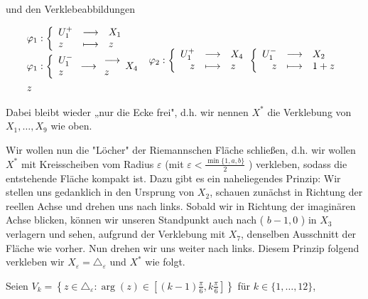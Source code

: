 \documentclass[10pt, letterpaper]{article}
\begin{document}
und den Verklebeabbildungen

$$
\begin{aligned}
& \varphi_{1}:\left\{\begin{array}{lll}
U_{1}^{+} & \longrightarrow & X_{1} \\
z & \longmapsto & z
\end{array}\right. \\
& \varphi_{1}:\left\{\begin{array}{l}
U_{1}^{-} \\
z
\end{array} \longrightarrow \begin{array}{l}
\longrightarrow \\
z
\end{array} X_{4}\right. \\
& z
\end{aligned} \quad \varphi_{2}:\left\{\begin{array} { r l l } 
{ U _ { 1 } ^ { + } } & { \longrightarrow } & { X _ { 4 } } \\
{ z } & { \longmapsto } & { z }
\end{array} \left\{\begin{array}{rll}
U_{1}^{-} & \longrightarrow & X_{2} \\
z & \longmapsto & 1+z
\end{array}\right.\right.
$$

Dabei bleibt wieder „nur die Ecke frei", d.h. wir nennen $X^{*}$ die Verklebung von $X_{1}, \ldots, X_{9}$ wie oben.

Wir wollen nun die "Löcher" der Riemannschen Fläche schließen, d.h. wir wollen $X^{*}$ mit Kreisscheiben vom Radius $\varepsilon$ (mit $\varepsilon<\frac{\min \{1, a, b\}}{2}$ ) verkleben, sodass die entstehende Fläche kompakt ist. Dazu gibt es ein naheliegendes Prinzip: Wir stellen uns gedanklich in den Ursprung von $X_{2}$, schauen zunächst in Richtung der reellen Achse und drehen uns nach links. Sobald wir in Richtung der imaginären Achse blicken, können wir unseren Standpunkt auch nach ( $b-1,0$ ) in $X_{3}$ verlagern und sehen, aufgrund der Verklebung mit $X_{7}$, denselben Ausschnitt der Fläche wie vorher. Nun drehen wir uns weiter nach links. Diesem Prinzip folgend verkleben wir $X_{\varepsilon}=\triangle_{\varepsilon}$ und $X^{*}$ wie folgt.

Seien $V_{k}=\left\{z \in \triangle_{\varepsilon}: \arg (z) \in\left[(k-1) \frac{\pi}{6}, k \frac{\pi}{6}\right]\right\}$ für $k \in\{1, \ldots, 12\}$,
\end{document}
